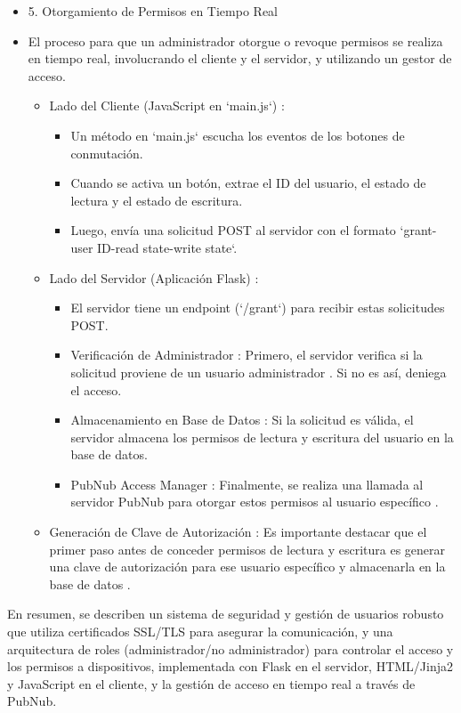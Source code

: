 \documentclass{report}
\begin{document}
\begin{itemize}
    \item 5. Otorgamiento de Permisos en Tiempo Real
    \item El proceso para que un administrador otorgue o revoque permisos se realiza en tiempo real, involucrando el cliente y el servidor, y utilizando 
    un gestor de acceso.
    \begin{itemize}
        \item  Lado del Cliente (JavaScript en `main.js`) :
        \begin{itemize}
            \item Un método en `main.js` escucha los eventos de los botones de conmutación.
            \item Cuando se activa un botón, extrae el ID del usuario, el estado de lectura y el estado de escritura.
            \item Luego, envía una  solicitud POST  al servidor con el formato `grant-user ID-read state-write state`.
        \end{itemize}
        
        \item  Lado del Servidor (Aplicación Flask) :
        \begin{itemize}
            \item El servidor tiene un endpoint (`/grant`) para recibir estas solicitudes POST.
            \item Verificación de Administrador : Primero, el servidor  verifica si la solicitud proviene de un usuario administrador . Si no es así, 
            deniega el acceso.
            \item Almacenamiento en Base de Datos : Si la solicitud es válida, el servidor  almacena los permisos de lectura y escritura del usuario 
            en la base de datos.
            \item PubNub Access Manager : Finalmente, se realiza una llamada al  servidor PubNub para otorgar estos permisos al usuario específico .
        \end{itemize}

        \item  Generación de Clave de Autorización : Es importante destacar que el primer paso antes de conceder permisos de lectura y escritura 
        es  generar una clave de autorización para ese usuario específico y almacenarla en la base de datos .    
    \end{itemize}
\end{itemize}

En resumen, se  describen un sistema de seguridad y gestión de usuarios robusto que utiliza certificados SSL/TLS para asegurar la 
comunicación, y una arquitectura de roles (administrador/no administrador) para controlar el acceso y los permisos a dispositivos, 
implementada con Flask en el servidor, HTML/Jinja2 y JavaScript en el cliente, y la gestión de acceso en tiempo real a través de PubNub.
\end{document}
